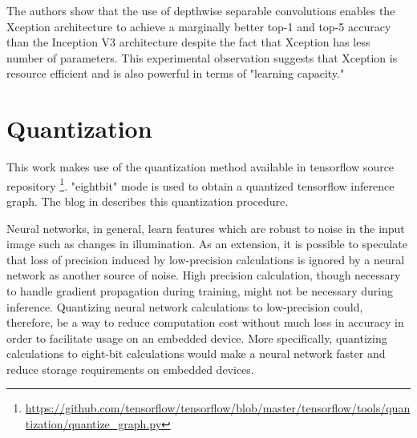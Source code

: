 The authors show that the use of depthwise separable convolutions enables the Xception architecture to achieve a marginally better top-1 and top-5 accuracy than the Inception V3 architecture despite the fact that Xception has less number of parameters. This experimental observation suggests that Xception is resource efficient and is also powerful in terms of "learning capacity."





\section{Quantization}

This work makes use of the quantization method available in tensorflow source repository \footnote{\url{https://github.com/tensorflow/tensorflow/blob/master/tensorflow/tools/quantization/quantize_graph.py}}. "eightbit" mode is used to obtain a quantized tensorflow inference graph. The blog in \cite{quant_blog} describes this quantization procedure.

Neural networks, in general, learn features which are robust to noise in the input image such as changes in illumination. As an extension, it is possible to speculate that loss of precision induced by low-precision calculations is ignored by a neural network as another source of noise. High precision calculation, though necessary to handle gradient propagation during training, might not be necessary during inference. Quantizing neural network calculations to low-precision could, therefore, be a way to reduce computation cost without much loss in accuracy in order to facilitate usage on an embedded device. More specifically, quantizing calculations to eight-bit calculations would make a neural network faster and reduce storage requirements on embedded devices. 

